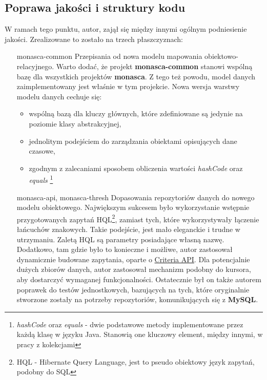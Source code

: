     \subsection{Poprawa jakości i struktury kodu}
    W ramach tego punktu, autor, zajął się między innymi ogólnym podniesienie jakości. Zrealizowane to zostało
    na trzech płaszczyznach:
    \begin{itemize}
        \item[monasca-common]
        Przepisania od nowa modelu mapowania obiektowo-relacyjnego. Warto dodać, że projekt \textbf{monasca-common} stanowi
        wspólną bazę dla wszystkich projektów \textbf{monasca}. Z tego też powodu, model danych zaimplementowany jest
        właśnie w tym projekcie. Nowa wersja warstwy modelu danych cechuje się:
        \begin{itemize}
            \item wspólną bazą dla kluczy głównych, które zdefiniowane są jedynie na poziomie klasy abstrakcyjnej,
            \item jednolitym podejściem do zarządzania obiektami opisujących dane czasowe,
            \item zgodnym z zalecaniami sposobem obliczenia wartości \textit{hashCode} oraz \textit{equals}
            \footnote{\textit{hashCode} oraz \textit{equals} - dwie podstawowe metody implementowane przez każdą klasę w języku Java. Stanowią one
                kluczowy element, między innymi, w pracy z kolekcjami}
        \end{itemize}
        \item[monasca-api, monasca-thresh]
        Dopasowania repozytoriów danych do nowego modelu obiektowego. Największym sukcesem było
        wykorzystanie wstępnie przygotowanych zapytań HQL\footnote{HQL - Hibernate Query Language, jest to
            pseudo obiektowy język zapytań, podobny do SQL}, zamiast tych, które wykorzystywały łączenie
        łańcuchów znakowych. Takie podejście, jest mało eleganckie i trudne w utrzymaniu. Zaletą HQL są
        parametry posiadające własną nazwę. Dodatkowo, tam gdzie było to konieczne i możliwe, autor
        zastosował dynamicznie budowane zapytania, oparte o 
        \href{https://docs.jboss.org/hibernate/orm/5.0/devguide/en-US/html_single/#d5e3489}{Criteria API}.
        Dla potencjalnie dużych zbiorów danych, autor zastosował mechanizm podobny do kursora, aby
        dostarczyć wymaganej funkcjonalności. Ostatecznie był on także autorem poprawek do testów jednostkowych,
        bazujących na tych, które oryginalnie stworzone zostały na potrzeby repozytoriów, komunikujących się
        z \textbf{MySQL}.
    \end{itemize}
    
